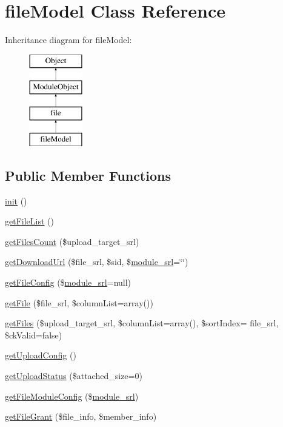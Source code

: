 \hypertarget{classfileModel}{}\section{file\+Model Class Reference}
\label{classfileModel}
Inheritance diagram for file\+Model\+:\begin{figure}[H]
\begin{center}
\leavevmode
\includegraphics[height=4.000000cm]{classfileModel}
\end{center}
\end{figure}
\subsection*{Public Member Functions}
\begin{DoxyCompactItemize}
\item 
\hyperlink{classfileModel_a5dd9542d5c0ed61a7dd0158900ff5c92}{init} ()
\item 
\hyperlink{classfileModel_ad2b29057d5e61a15cb2caf794fc12291}{get\+File\+List} ()
\item 
\hyperlink{classfileModel_a37f83c04ce8adc09f576b94e04264f5b}{get\+Files\+Count} (\$upload\+\_\+target\+\_\+srl)
\item 
\hyperlink{classfileModel_ad626512a63e99f97d0e5a6fac7dae8c8}{get\+Download\+Url} (\$file\+\_\+srl, \$sid, \$\hyperlink{ko_8install_8php_a370bb6450fab1da3e0ed9f484a38b761}{module\+\_\+srl}=\char`\"{}\char`\"{})
\item 
\hyperlink{classfileModel_a81beeda11f761f561adb60ebc72d6187}{get\+File\+Config} (\$\hyperlink{ko_8install_8php_a370bb6450fab1da3e0ed9f484a38b761}{module\+\_\+srl}=null)
\item 
\hyperlink{classfileModel_a1475f2eb6cc740bf7f5ef67a4654fb24}{get\+File} (\$file\+\_\+srl, \$column\+List=array())
\item 
\hyperlink{classfileModel_a149c4f1e8710ec09c7dab5284b72bd48}{get\+Files} (\$upload\+\_\+target\+\_\+srl, \$column\+List=array(), \$sort\+Index= \textquotesingle{}file\+\_\+srl\textquotesingle{}, \$ck\+Valid=false)
\item 
\hyperlink{classfileModel_a0d268e1f840c7495de96ed511c7053fc}{get\+Upload\+Config} ()
\item 
\hyperlink{classfileModel_a63c3d6b41db33e55521cd3f0b10ab493}{get\+Upload\+Status} (\$attached\+\_\+size=0)
\item 
\hyperlink{classfileModel_aefe867916bce4a5f3451bb9afc464844}{get\+File\+Module\+Config} (\$\hyperlink{ko_8install_8php_a370bb6450fab1da3e0ed9f484a38b761}{module\+\_\+srl})
\item 
\hyperlink{classfileModel_a129e251c2a4ed575126c902a64ed3f59}{get\+File\+Grant} (\$file\+\_\+info, \$member\+\_\+info)
\end{DoxyCompactItemize}

